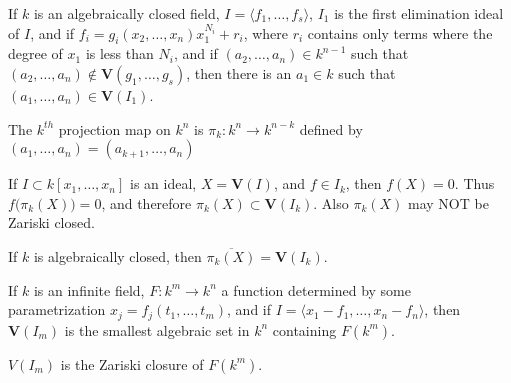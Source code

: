 \documentclass[crop=false,class=article,oneside]{standalone}
\begin{document}
        \begin{theorem}
            If $k$ is an algebraically closed field,
            $I=\langle{f_{1}},\hdots,f_{s}\rangle$, $I_{1}$ is
            the first elimination ideal of $I$, and if
            $f_{i}=g_{i}(x_{2},\hdots,x_{n})x_{1}^{N_i}+r_{i}$,
            where $r_{i}$ contains only terms where the degree
            of $x_{1}$ is less than $N_{i}$, and if
            $(a_{2},\hdots,a_{n})\in{k}^{n-1}$ such that
            $(a_{2},\hdots,a_{n})\notin%
             \mathbf{V}(g_{1},\hdots,g_{s})$,
             then there is an $a_1 \in k$ such that
             $(a_{1},\hdots,a_{n})\in\mathbf{V}(I_1)$.
        \end{theorem}
        \begin{definition}
            The $k^{th}$ projection map on $k^{n}$ is
            $\pi_{k}:k^{n}\rightarrow k^{n-k}$ defined by
            $(a_{1},\hdots,a_{n})=(a_{k+1},\hdots,a_{n})$
        \end{definition}
        \begin{remark}
            If $I\subset{k}[x_{1},\hdots,x_{n}]$ is an ideal,
            $X=\mathbf{V}(I)$, and $f\in{I_{k}}$,
            then $f(X)=0$.
            Thus $f\big(\pi_{k}(X)\big)=0$, and therefore
            $\pi_{k}(X)\subset\mathbf{V}(I_k)$.
            Also $\pi_{k}(X)$ may NOT be Zariski closed.
        \end{remark}
        \begin{theorem}
            If $k$ is algebraically closed,
            then $\overline{\pi_k(X)}=\mathbf{V}(I_k)$.
        \end{theorem}
        \begin{theorem}
            If $k$ is an infinite field,
            $F:k^{m}\rightarrow{k^{n}}$ a function determined
            by some parametrization
            $x_{j}=f_{j}(t_{1},\hdots,t_{m})$, and if
            $I=\langle{x_{1}-f_{1}},\hdots,x_{n}-f_{n}\rangle$,
            then $\mathbf{V}(I_m)$ is the smallest algebraic
            set in $k^{n}$ containing $F(k^{m})$.
        \end{theorem}
        \begin{remark}
            $V(I_{m})$ is the Zariski closure of $F(k^{m})$.
        \end{remark}
\end{document}
